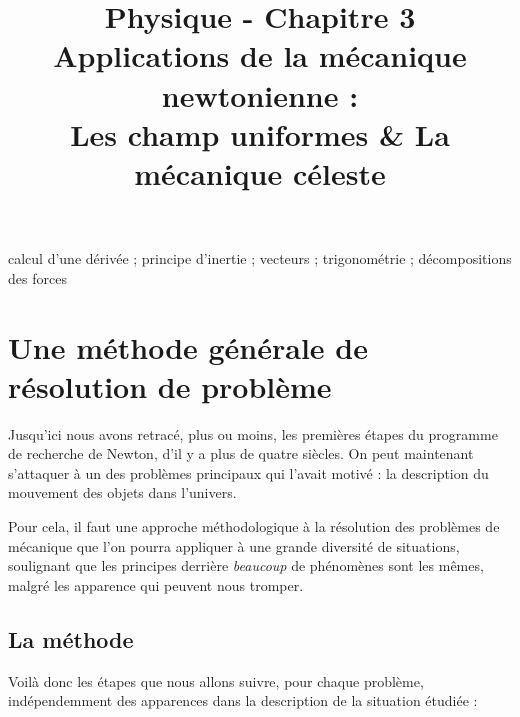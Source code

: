 \documentclass[11pt,a4paper]{article}
\title{\large Physique - Chapitre 3 \\ \LARGE Applications de la mécanique newtonienne :  \\ \large Les champ uniformes \& La mécanique céleste}
\date{}
\author{}
\begin{document}
\maketitle
\vspace{-2cm}

\begin{tcolorbox}[title=Notions de la classe de première à rappeler]
calcul d'une dérivée ; principe d'inertie ; vecteurs ; trigonométrie ; décompositions des forces
\end{tcolorbox}
\tableofcontents

\section{Une méthode générale de résolution de problème}

Jusqu’ici nous avons retracé, plus ou moins, les premières étapes du programme de recherche de Newton, d’il y a plus de quatre siècles. On peut maintenant s’attaquer à un des problèmes principaux qui l’avait motivé : la description du mouvement des objets dans l’univers. 

Pour cela, il faut une approche méthodologique à la résolution des problèmes de mécanique que l'on pourra appliquer à une grande diversité de situations, soulignant que les principes derrière \textit{beaucoup} de phénomènes sont les mêmes, malgré les apparence qui peuvent nous tromper. 


\subsection{La méthode}
Voilà donc les étapes que nous allons suivre, pour chaque problème, indépendemment des apparences dans la description de la situation étudiée : 
\newpage
\end{document}

